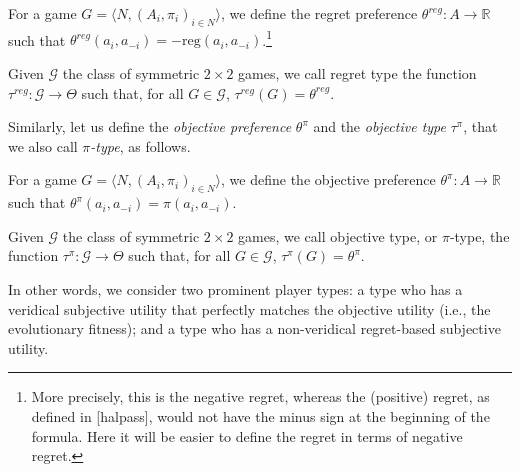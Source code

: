 \documentclass[fleqn,reqno,11pt]{article}
\begin{document}
\begin{definition} \label{defn:regpref}

For a game $ G=\langle N, (A_i , \pi_i)_{i \in N} \rangle $, we define the regret preference $ \theta^{reg}: A \rightarrow \mathbb{R} $ such that $ \theta^{reg}(a_i,a_{-i})=-\text{reg}(a_i,a_{-i}) $.\footnote{More precisely, this is the negative regret, whereas the (positive) regret, as defined in [halpass], would not have the minus sign at the beginning of the formula. Here it will be easier to define the regret in terms of negative regret.}

\end{definition}



\begin{definition} \label{defn:regtype}

Given $ \mathcal{G} $ the class of symmetric $ 2 \times 2 $ games, we call regret type the function $\tau^{reg}: \mathcal{G} \rightarrow  \Theta$ such that, for all $G \in \mathcal{G}$, $ \tau^{reg}(G)= \theta^{reg}$.

\end{definition}

\noindent Similarly, let us define the \textit{objective preference} $\theta^{\pi}$ and the \textit{objective type} $ \tau^{\pi} $, that we also call $\pi$\textit{-type}, as follows. 

\begin{definition} \label{defn:objpref}

For a game $ G=\langle N, (A_i , \pi_i)_{i \in N} \rangle $, we define the objective preference $ \theta^{\pi}: A \rightarrow \mathbb{R} $ such that $ \theta^{\pi}(a_i,a_{-i})=\pi(a_i,a_{-i}) $.

\end{definition}


\begin{definition} \label{defn:objtype}

Given $ \mathcal{G} $ the class of symmetric $ 2 \times 2 $ games, we call objective type, or $\pi$-type, the function $\tau^{\pi}: \mathcal{G} \rightarrow  \Theta$ such that, for all $G \in \mathcal{G}$, $ \tau^{\pi}(G)= \theta^{\pi}$.

\end{definition}

\noindent In other words, we consider two prominent player types: a type who has a veridical subjective utility that perfectly matches the objective utility (i.e., the evolutionary fitness); and a type who has a non-veridical regret-based subjective utility. 
\end{document}
